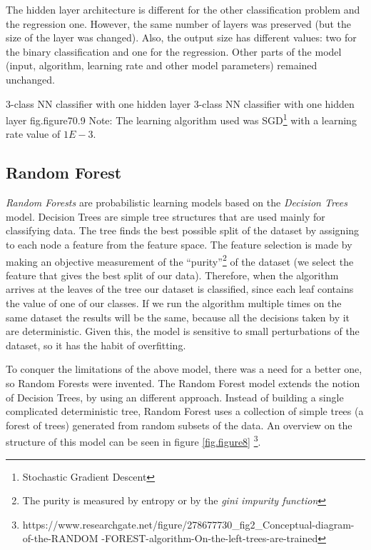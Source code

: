The hidden layer architecture is different for the other classification problem and the 
regression one. However, the same number of layers was preserved (but the size of the 
layer was changed). Also, the output size has different values: two for the binary 
classification and one for the regression. Other parts of the model (input, algorithm, 
learning rate and other model parameters) remained unchanged.

%
    {3-class NN classifier with one hidden layer}%
    {3-class NN classifier with one hidden layer}%
    {fig.figure7}{0.9}
Note: The learning algorithm used was SGD\footnote{Stochastic Gradient Descent} 
with a learning rate value of $1E-3$.

\subsection{Random Forest}

{\it Random Forests} are probabilistic learning models based on the {\it 
Decision Trees} model. Decision Trees are simple tree structures that are 
used mainly for classifying data. The tree finds the best possible split of 
the dataset by assigning to each node a feature from the feature space. 
The feature selection is made by making an objective measurement of the 
``purity''\footnote{The purity is measured by entropy or by the {\it gini 
impurity function}} of the dataset (we select the feature that gives the best 
split of our data). Therefore, when the algorithm arrives at the leaves of 
the tree our dataset is classified, since each leaf contains the value of one 
of our classes. If we run the algorithm multiple times on the same dataset 
the results will be the same, because all the decisions taken by it are 
deterministic. Given this, the model is sensitive to small perturbations of 
the dataset, so it has the habit of overfitting. 

To conquer the limitations of the above model, there was a need for a better 
one, so Random Forests were invented. The Random Forest model extends the 
notion of Decision Trees, by using an different approach. Instead of building 
a single complicated deterministic tree, Random Forest uses a collection 
of simple trees (a forest of trees) generated from random subsets of the data. 
An overview on the structure of this model can be seen in figure \ref{fig.figure8}
\footnote{https://www.researchgate.net/figure/278677730\_fig2\_Conceptual-diagram-of-the-RANDOM 
-FOREST-algorithm-On-the-left-trees-are-trained}.

